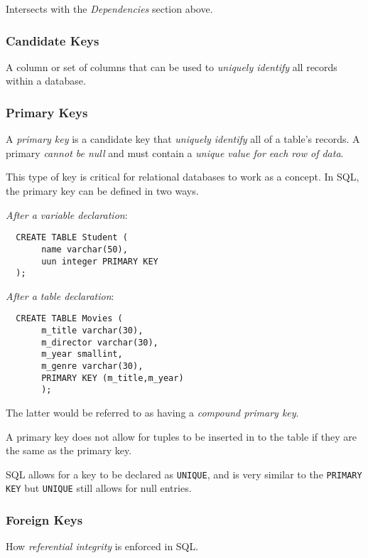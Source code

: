 \documentclass{article}
\begin{document}
Intersects with the \textit{Dependencies} section above.

\subsubsection{Candidate Keys}

A column or set of columns that can be used to \textit{uniquely identify} all records within a database.

\subsubsection{Primary Keys}

A \textit{primary key} is a candidate key that \textit{uniquely identify} all of a table's records. A primary \textit{cannot be null} and must contain a \textit{unique value for each row of data}.

This type of key is critical for relational databases to work as a concept. In SQL, the primary key can be defined in two ways.

\textit{After a variable declaration}:

\begin{lstlisting}
  CREATE TABLE Student (
       name varchar(50),
       uun integer PRIMARY KEY
  );
\end{lstlisting}

\textit{After a table declaration}:

\begin{lstlisting}
  CREATE TABLE Movies (
       m_title varchar(30),
       m_director varchar(30),
       m_year smallint,
       m_genre varchar(30),
       PRIMARY KEY (m_title,m_year)
       );
\end{lstlisting}

The latter would be referred to as having a \textit{compound primary key}.

A primary key does not allow for tuples to be inserted in to the table if they are the same as the primary key.

SQL allows for a key to be declared as \texttt{UNIQUE}, and is very similar to the \texttt{PRIMARY KEY} but \texttt{UNIQUE} still allows for null entries.

\subsubsection{Foreign Keys}

How \textit{referential integrity} is enforced in SQL.
\end{document}
